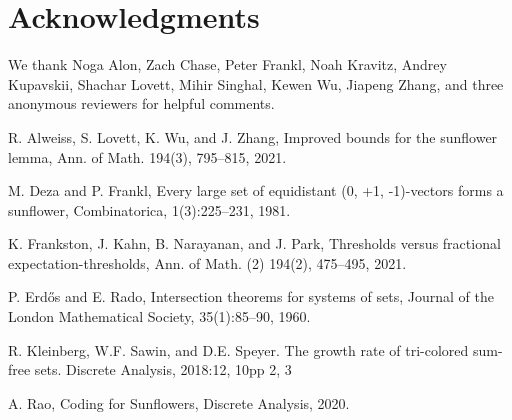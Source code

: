 \documentclass[12pt]{article}
\begin{document}
\section{Acknowledgments}

We thank Noga Alon, Zach Chase, Peter Frankl, Noah Kravitz, Andrey Kupavskii, Shachar Lovett, Mihir Singhal, Kewen Wu, Jiapeng Zhang, and three anonymous reviewers for helpful comments.

\begin{thebibliography}{99}

R. Alweiss, S. Lovett, K. Wu, and J. Zhang, Improved bounds for the sunflower lemma, Ann. of Math. 194(3), 795--815, 2021.

M. Deza and P. Frankl, Every large set of equidistant (0, +1, -1)-vectors forms a sunflower, Combinatorica, 1(3):225--231, 1981.

K. Frankston, J. Kahn, B. Narayanan, and J. Park, Thresholds versus fractional expectation-thresholds, Ann. of Math. (2) 194(2), 475--495, 2021.

P. Erd\H{o}s and E. Rado, Intersection theorems for systems of sets, Journal of the London Mathematical Society, 35(1):85–90, 1960.

\iffalse

\bibitem{ff2} P. Frankl and Z. Furedi: Exact solution of some Tur\'an-type problems, Journal of Combinatorial Theory, Ser. A 45 (1987), 226--262.  
 

\bibitem{ff1}
P. Frankl and Z. Furedi: Forbidding just one intersection, Journal of Combinatorial Theory, Ser. A 39 (1985), 160--176.

\fi

R. Kleinberg, W.F. Sawin, and D.E. Speyer. The growth rate of tri-colored sum-free
sets. Discrete Analysis, 2018:12, 10pp 2, 3

A. Rao, Coding for Sunflowers, Discrete Analysis, 2020.

\iffalse

\bibitem{fursun}
A. Furedi: On finite set-systems whose every intersection is a kernel of a star, Discrete Mathematics 47 (1983), 129--132. 

\fi

\end{thebibliography}


		
\end{document}
